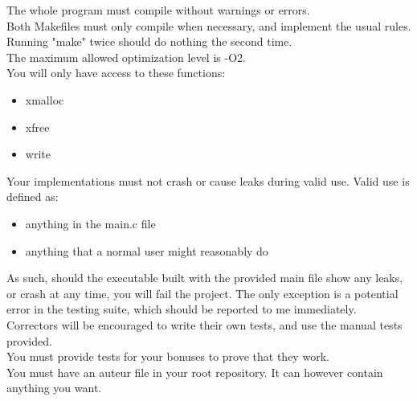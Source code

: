 \documentclass{42-en}
\begin{document}
    The whole program must compile without warnings or errors.\\

    Both Makefiles must only compile when necessary, and implement the usual rules.
    Running "make" twice should do nothing the second time.\\

    The maximum allowed optimization level is -O2.\\

    You will only have access to these functions:\\
    \begin{itemize}\itemsep7pt
        \item xmalloc
        \item xfree
        \item write
    \end{itemize}
    

    Your implementations must not crash or cause leaks during valid use. Valid use is defined as:
    \begin{itemize}\itemsep7pt
        \item anything in the main.c file
        \item anything that a normal user might reasonably do
    \end{itemize}

    As such, should the executable built with the provided main file show any leaks,
    or crash at any time, you will fail the project. The only exception is a potential
    error in the testing suite, which should be reported to me immediately.\\

    Correctors will be encouraged to write their own tests, and use the manual tests provided.\\

    You must provide tests for your bonuses to prove that they work.\\

    You must have an auteur file in your root repository. It can however contain anything you want.\\
\end{document}
